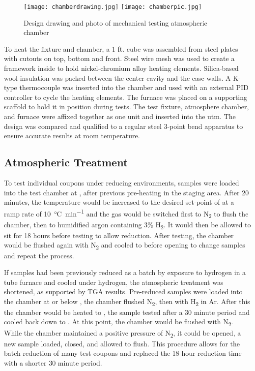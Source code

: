         \begin{figure}[p]
            \texttt{[image: chamberdrawing.jpg]}
            \texttt{[image: chamberpic.jpg]}
            \caption{Design drawing and photo of mechanical testing atmospheric chamber}
            \label{fig:chamber}
        \end{figure}

        To heat the fixture and chamber, a 1 ft. cube was assembled from steel plates with cutouts on top, bottom and front.
        Steel wire mesh was used to create a framework inside to hold nickel-chromium alloy heating elements.
        Silica-based wool insulation was packed between the center cavity and the case walls.
        A K-type thermocouple was inserted into the chamber and used with an external PID controller to cycle the heating elements.
        The furnace was placed on a supporting scaffold to hold it in position during tests.
        The test fixture, atmosphere chamber, and furnace were affixed together as one unit and inserted into the \gls{utm}.
        The design was compared and qualified to a regular steel 3-point bend apparatus to ensure accurate results at room temperature.

    \subsection{Atmospheric Treatment}
        To test individual coupons under reducing environments, samples were loaded into the test chamber at , after previous pre-heating in the staging area.
        After 20 minutes, the temperature would be increased to the desired set-point of  at a ramp rate of \SI{10}{\celsius\per\minute} and the gas would be switched first to N\textsubscript{2} to flush the chamber, then to humidified argon containing 3\% H\textsubscript{2}.
        It would then be allowed to sit for 18 hours before testing to allow reduction.
        After testing, the chamber would be flushed again with N\textsubscript{2} and cooled to  before opening to change samples and repeat the process.

        If samples had been previously reduced as a batch by exposure to hydrogen in a tube furnace and cooled under hydrogen, the atmospheric treatment was shortened, as supported by TGA results.
        Pre-reduced samples were loaded into the chamber at or below , the chamber flushed N\textsubscript{2}, then with H\textsubscript{2} in Ar.
        After this the chamber would be heated to , the sample tested after a 30 minute period and cooled back down to .
        At this point, the chamber would be flushed with N\textsubscript{2}.
        While the chamber maintained a positive pressure of N\textsubscript{2}, it could be opened, a new sample loaded, closed, and allowed to flush.
        This procedure allows for the batch reduction of many test coupons and replaced the 18 hour reduction time with a shorter 30 minute period.

